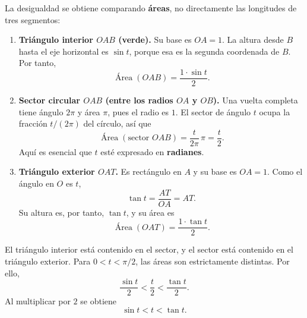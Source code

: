 \documentclass[10pt,a5paper]{article}
\begin{document}
\begin{center}
\end{center}

La desigualdad se obtiene comparando \textbf{áreas}, no directamente las longitudes de tres segmentos:
\begin{enumerate}
  \item \textbf{Triángulo interior $OAB$ (verde).} Su base es $OA=1$. La altura desde $B$ hasta el eje horizontal es $\sin t$, porque esa es la segunda coordenada de $B$. Por tanto,
  \[
    \operatorname{Área}(OAB)=\frac{1\cdot\sin t}{2}.
  \]
  \item \textbf{Sector circular $OAB$ (entre los radios $OA$ y $OB$).} Una vuelta completa tiene ángulo $2\pi$ y área $\pi$, pues el radio es $1$. El sector de ángulo $t$ ocupa la fracción $t/(2\pi)$ del círculo, así que
  \[
    \operatorname{Área}(\text{sector }OAB)=\frac{t}{2\pi}\,\pi=\frac t2.
  \]
  Aquí es esencial que $t$ esté expresado en \textbf{radianes}.
  \item \textbf{Triángulo exterior $OAT$.} Es rectángulo en $A$ y su base es $OA=1$. Como el ángulo en $O$ es $t$,
  \[
    \tan t=\frac{AT}{OA}=AT.
  \]
  Su altura es, por tanto, $\tan t$, y su área es
  \[
    \operatorname{Área}(OAT)=\frac{1\cdot\tan t}{2}.
  \]
\end{enumerate}

El triángulo interior está contenido en el sector, y el sector está contenido en el triángulo exterior. Para $0<t<\pi/2$, las áreas son estrictamente distintas. Por ello,
\[
  \frac{\sin t}{2}<\frac t2<\frac{\tan t}{2}.
\]
Al multiplicar por $2$ se obtiene
\[
  \boxed{\sin t<t<\tan t}.
\]
\end{document}
